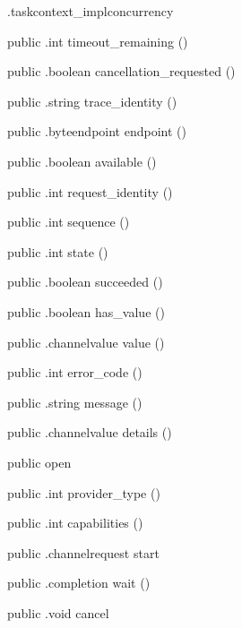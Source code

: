 \begin{CrexxClass}{.taskcontext\_impl}{concurrency}
\begin{Members}
    \Method
      {public}
      {.int}
      {timeout\_remaining}
      {()}

    \Method
      {public}
      {.boolean}
      {cancellation\_requested}
      {()}

    \Method
      {public}
      {.string}
      {trace\_identity}
      {()}

    \Method
      {public}
      {.byteendpoint}
      {endpoint}
      {()}

    \Method
      {public}
      {.boolean}
      {available}
      {()}

    \Method
      {public}
      {.int}
      {request\_identity}
      {()}

    \Method
      {public}
      {.int}
      {sequence}
      {()}

    \Method
      {public}
      {.int}
      {state}
      {()}

    \Method
      {public}
      {.boolean}
      {succeeded}
      {()}

    \Method
      {public}
      {.boolean}
      {has\_value}
      {()}

    \Method
      {public}
      {.channelvalue}
      {value}
      {()}

    \Method
      {public}
      {.int}
      {error\_code}
      {()}

    \Method
      {public}
      {.string}
      {message}
      {()}

    \Method
      {public}
      {.channelvalue}
      {details}
      {()}

    \Factory
      {public}
      {open}
      {}

    \Method
      {public}
      {.int}
      {provider\_type}
      {()}

    \Method
      {public}
      {.int}
      {capabilities}
      {()}

    \Method
      {public}
      {.channelrequest}
      {start}
      {}

    \Method
      {public}
      {.completion}
      {wait}
      {()}

    \Method
      {public}
      {.void}
      {cancel}
      {}


\end{Members}
\end{CrexxClass}
